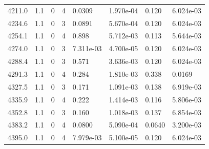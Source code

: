 \documentclass[preview]{standalone}
\begin{document}
{{{{{{{\begin{tabular}{L{1.2cm}C{1.2cm} C{0.3cm}C{0.5cm} C{1.4cm}C{1.4cm} C{1.4cm}C{1.4cm}}
  4211.0  &   1.1  & 0     &  4 &  0.0309  & 1.970e-04  & 0.120 &  6.024e-03   \\ 
  4234.6  &   1.1  & 0     &  3 &  0.0891  & 5.670e-04  & 0.120 &  6.024e-03   \\ 
  4254.1  &   1.1  & 0     &  4 &  0.898  & 5.712e-03  & 0.113 &  5.644e-03   \\ 
  4274.0  &   1.1  & 0     &  3 &  7.311e-03  & 4.700e-05  & 0.120 &  6.024e-03   \\ 
  4288.4  &   1.1  & 0     &  3 &  0.571  & 3.636e-03  & 0.120 &  6.024e-03   \\ 
  4291.3  &   1.1  & 0     &  4 &  0.284  & 1.810e-03  & 0.338 &  0.0169   \\ 
  4327.5  &   1.1  & 0     &  3 &  0.171  & 1.091e-03  & 0.138 &  6.919e-03   \\ 
  4335.9  &   1.1  & 0     &  4 &  0.222  & 1.414e-03  & 0.116 &  5.806e-03   \\ 
  4352.8  &   1.1  & 0     &  3 &  0.160  & 1.018e-03  & 0.137 &  6.854e-03   \\ 
  4383.2  &   1.1  & 0     &  4 &  0.0800  & 5.090e-04  & 0.0640 &  3.200e-03   \\ 
  4395.0  &   1.1  & 0     &  4 &  7.979e-03  & 5.100e-05  & 0.120 &  6.024e-03   \\ 
\hline 
\end{tabular} 

}}}}}}}
\end{document}
